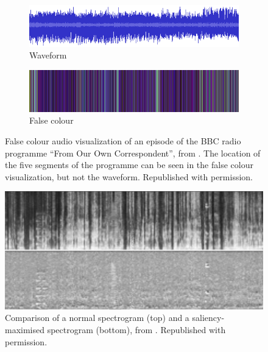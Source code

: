 \begin{figure}[p]
  \centering
  \begin{subfigure}[b]{0.8\textwidth}
      \includegraphics[width=\textwidth]{figs/fooc-waveform.png}
      \caption{Waveform}
      \label{fig:Mason2007-waveform}
  \end{subfigure}

  \begin{subfigure}[b]{0.8\textwidth}
      \includegraphics[width=\textwidth]{figs/fooc-false.png}
      \caption{False colour}
      \label{fig:Mason2007-false}
  \end{subfigure}
  \caption[False colour audio visualization of an episode of the BBC radio programme ``From Our Own Correspondent'',
  from \citet{Mason2007}.]{False colour audio visualization of an episode of the BBC radio programme ``From Our Own
    Correspondent'', from \citet{Mason2007}.  The location of the five segments of the programme can be seen in the
    false colour visualization, but not the waveform. Republished with permission.}
  \label{fig:Mason2007}
\end{figure}

\begin{figure}[p]
  \centering
  \includegraphics[width=.8\textwidth]{figs/Lin2013.png}
  \caption{Comparison of a normal spectrogram (top) and a saliency-maximised spectrogram (bottom), from
  \citet{Lin2013}. Republished with permission.}
  \label{fig:Lin2013}
\end{figure}


